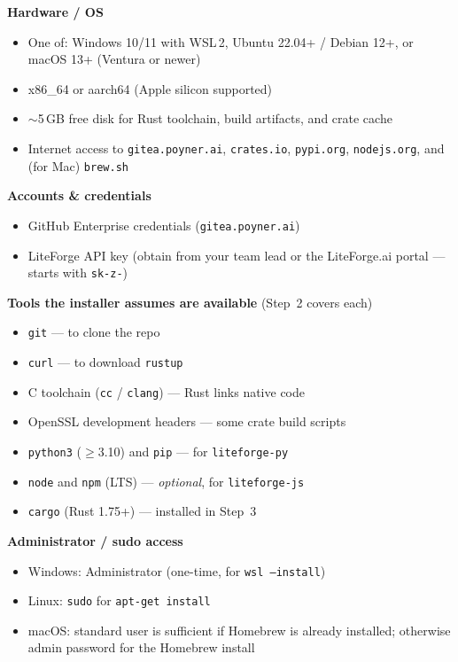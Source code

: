 \documentclass[11pt,letterpaper]{article}
\begin{document}
\begin{tcolorbox}[infobox={Prerequisites}]
\textbf{Hardware / OS}
\begin{itemize}[nosep]
  \item One of: Windows 10/11 with WSL\,2, Ubuntu 22.04+ / Debian 12+, or
    macOS 13+ (Ventura or newer)
  \item x86\_64 or aarch64 (Apple silicon supported)
  \item $\sim$5\,GB free disk for Rust toolchain, build artifacts, and
    crate cache
  \item Internet access to \texttt{gitea.poyner.ai}, \texttt{crates.io},
    \texttt{pypi.org}, \texttt{nodejs.org}, and (for Mac) \texttt{brew.sh}
\end{itemize}
\textbf{Accounts \& credentials}
\begin{itemize}[nosep]
  \item GitHub Enterprise credentials (\texttt{gitea.poyner.ai})
  \item LiteForge API key (obtain from your team lead or the LiteForge.ai portal ---
    starts with \texttt{sk-z-})
\end{itemize}
\textbf{Tools the installer assumes are available} (Step~2 covers each)
\begin{itemize}[nosep]
  \item \texttt{git} --- to clone the repo
  \item \texttt{curl} --- to download \texttt{rustup}
  \item C toolchain (\texttt{cc} / \texttt{clang}) --- Rust links native
    code
  \item OpenSSL development headers --- some crate build scripts
  \item \texttt{python3} ($\geq$3.10) and \texttt{pip} --- for
    \texttt{liteforge-py}
  \item \texttt{node} and \texttt{npm} (LTS) --- \emph{optional}, for
    \texttt{liteforge-js}
  \item \texttt{cargo} (Rust 1.75+) --- installed in Step~3
\end{itemize}
\textbf{Administrator / sudo access}
\begin{itemize}[nosep]
  \item Windows: Administrator (one-time, for \texttt{wsl --install})
  \item Linux: \texttt{sudo} for \texttt{apt-get install}
  \item macOS: standard user is sufficient if Homebrew is already
    installed; otherwise admin password for the Homebrew install
\end{itemize}
\end{tcolorbox}
\end{document}
